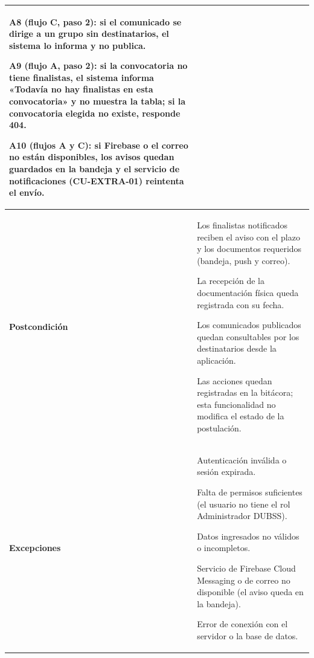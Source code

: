 \begin{longtable}{>{\raggedright\arraybackslash}p{2.9cm} >{\raggedright\arraybackslash}p{12.6cm}}
\begin{cuvin}
    \item A8 (flujo C, paso 2): si el comunicado se dirige a un grupo sin destinatarios, el sistema lo informa y no publica.
    \item A9 (flujo A, paso 2): si la convocatoria no tiene finalistas, el sistema informa «Todavía no hay finalistas en esta convocatoria» y no muestra la tabla; si la convocatoria elegida no existe, responde 404.
    \item A10 (flujos A y C): si Firebase o el correo no están disponibles, los avisos quedan guardados en la bandeja y el servicio de notificaciones (CU-EXTRA-01) reintenta el envío.
\end{cuvin} \\
\midrule
\textbf{Postcondición} & \vspace{-\baselineskip}\begin{cuvin}
    \item Los finalistas notificados reciben el aviso con el plazo y los documentos requeridos (bandeja, push y correo).
    \item La recepción de la documentación física queda registrada con su fecha.
    \item Los comunicados publicados quedan consultables por los destinatarios desde la aplicación.
    \item Las acciones quedan registradas en la bitácora; esta funcionalidad no modifica el estado de la postulación.
\end{cuvin} \\
\midrule
\textbf{Excepciones} & \vspace{-\baselineskip}\begin{cuvin}
    \item Autenticación inválida o sesión expirada.
    \item Falta de permisos suficientes (el usuario no tiene el rol Administrador DUBSS).
    \item Datos ingresados no válidos o incompletos.
    \item Servicio de Firebase Cloud Messaging o de correo no disponible (el aviso queda en la bandeja).
    \item Error de conexión con el servidor o la base de datos.
\end{cuvin} \\
\end{longtable}
\endgroup
\addtocounter{table}{-1}

\label{sec:cap5_cu22}

